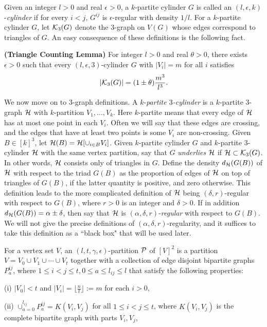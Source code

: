 \documentclass[11pt]{article}
\begin{document}
Given  an integer $l>0$ and real $\epsilon>0$, a $k$-partite
cylinder $G$ is called an $(l, \epsilon, k)$-{\it cylinder} if for
every $i<j$, $G^{ij}$ is $\epsilon$-regular with density $1/l$.
 For a $k$-partite cylinder $G$, let ${\cal K}_3(G)$ denote the
 $3$-graph on $V(G)$ whose edges correspond to triangles of $G$. An easy
consequence of these definitions is the following fact.

\begin{lemma} {\bf (Triangle Counting Lemma)}  \label{tlemma} For integer $l>0$ and  real $\theta>0$,
 there exists $\epsilon>0$ such that every $(l,\epsilon,3)$-cylinder $G$ with $|V_i|=m$ for all $i$ satisfies
$$|{\cal K}_3(G)| =(1\pm \theta)\frac{m^3}{l^3}.$$
\end{lemma}

We now move on to $3$-graph definitions. A $k$-{\it partite
$3$-cylinder} is a $k$-partite 3-graph ${\cal H}$ with $k$-partition
$V_1, \ldots, V_k$. Here $k$-partite means that every edge of ${\cal H}$
has at most one point in each $V_i$.  Often we will say that these
edges are crossing, and the edges that have at least two points is
some $V_i$ are non-crossing. Given $B \in [k]^3$, let
${\cal H}(B)={\cal H}[\cup_{i \in B}V_i]$. Given $k$-partite cylinder $G$ and
$k$-partite $3$-cylinder ${\cal H}$ with the same vertex partition, say
that $G$ {\it underlies} ${\cal H}$ if ${\cal H} \subset {\cal K}_3(G)$.  In other
words, ${\cal H}$ consists  only of triangles in $G$. Define the density
$d_{{\cal H}}(G(B))$ of ${\cal H}$ with respect to the triad $G(B)$ as the
proportion of edges of ${\cal H}$ on top of triangles of $G(B)$, if the
latter quantity is positive, and zero otherwise. This definition
leads to the more complicated definition of ${\cal H}$ being $(\delta,
r)$-regular with respect to  $G(B)$, where $r>0$ is an integer
and $\delta>0$. If in addition $d_{{\cal H}}(G(B))=\alpha \pm \delta$, then
say that ${\cal H}$ is $(\alpha, \delta, r)$-{\it regular} with respect
to $G(B)$. We will not give the precise definitions of $(\alpha,
\delta, r)$-regularity, and it suffices to take this definition as a
``black box" that will be used later.

For a vertex set $V$, an $(l, t, \gamma, \epsilon)$-partition
 ${\cal P}$ of $[V]^2$ is a partition $V=V_0 \cup V_1 \cup \cdots \cup V_t$
together with a collection of edge disjoint bipartite graphs $P_{a}^{ij}$,
 where $1\le i<j\le t, 0\le a\le l_{ij} \le l$ that satisfy the following properties:

(i) $|V_0|<t$ and $|V_i|=\lfloor \frac{n}{t} \rfloor:=m$ for each
$i>0$,

(ii) $\cup_{a=0}^{l_{ij}}P_{a}^{ij}=K(V_i, V_j)$ for all
$1\le i<j\le t$, where $K(V_i, V_j)$ is the complete bipartite graph
with parts $V_i, V_j$,
\end{document}
